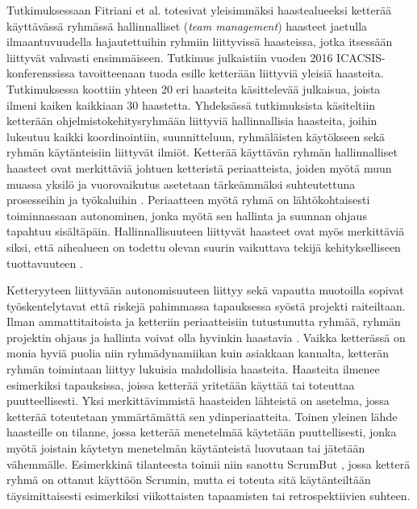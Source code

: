 Tutkimuksessaan Fitriani et al. \cite{7872736} totesivat yleisimmäksi haastealueeksi ketterää käyttävässä ryhmässä hallinnalliset (\textit{team management}) haasteet jaetulla ilmaantuvuudella hajautettuihin ryhmiin liittyvissä haasteissa, jotka itsessään liittyvät vahvasti ensimmäiseen. Tutkimus julkaistiin vuoden 2016 ICACSIS-konferenssissa tavoitteenaan tuoda esille ketterään liittyviä yleisiä haasteita. Tutkimuksessa koottiin yhteen 20 eri haasteita käsittelevää julkaisua, joista ilmeni kaiken kaikkiaan 30 haastetta. Yhdeksässä tutkimuksista käsiteltiin ketterään ohjelmistokehitysryhmään liittyviä hallinnallisia haasteita, joihin lukeutuu kaikki koordinointiin, suunnitteluun, ryhmäläisten käytökseen sekä ryhmän käytänteisiin liittyvät ilmiöt. Ketterää käyttävän ryhmän hallinnalliset haasteet ovat merkittäviä johtuen ketteristä periaatteista, joiden myötä muun muassa yksilö ja vuorovaikutus asetetaan tärkeämmäksi suhteutettuna prosesseihin ja työkaluihin \cite{beck2001agile}. Periaatteen myötä ryhmä on lähtökohtaisesti toiminnassaan autonominen, jonka myötä sen hallinta ja suunnan ohjaus tapahtuu sisältäpäin. Hallinnallisuuteen liittyvät haasteet ovat myös merkittäviä siksi, että aihealueen on todettu olevan suurin vaikuttava tekijä kehitykselliseen tuottavuuteen \cite{DEOMELO2013412}.

Ketteryyteen liittyvään autonomisuuteen liittyy sekä vapautta muotoilla sopivat työskentelytavat että riskejä pahimmassa tapauksessa syöstä projekti raiteiltaan. Ilman ammattitaitoista ja ketteriin periaatteisiin tutustunutta ryhmää, ryhmän projektin ohjaus ja hallinta voivat olla hyvinkin haastavia \cite{7872736}. Vaikka ketterässä on monia hyviä puolia niin ryhmädynamiikan kuin asiakkaan kannalta, ketterän ryhmän toimintaan liittyy lukuisia mahdollisia haasteita. Haasteita ilmenee esimerkiksi tapauksissa, joissa ketterää yritetään käyttää tai toteuttaa puutteellisesti. Yksi merkittävimmistä haasteiden lähteistä on asetelma, jossa ketterää toteutetaan ymmärtämättä sen ydinperiaatteita. Toinen yleinen lähde haasteille on tilanne, jossa ketterää menetelmää käytetään puuttellisesti, jonka myötä joistain käytetyn menetelmän käytänteistä luovutaan tai jätetään vähemmälle. Esimerkkinä tilanteesta toimii niin sanottu ScrumBut \cite{SCRUMBUT}, jossa ketterä ryhmä on ottanut käyttöön Scrumin, mutta ei toteuta sitä käytänteiltään täysimittaisesti esimerkiksi viikottaisten tapaamisten tai retrospektiivien suhteen.

